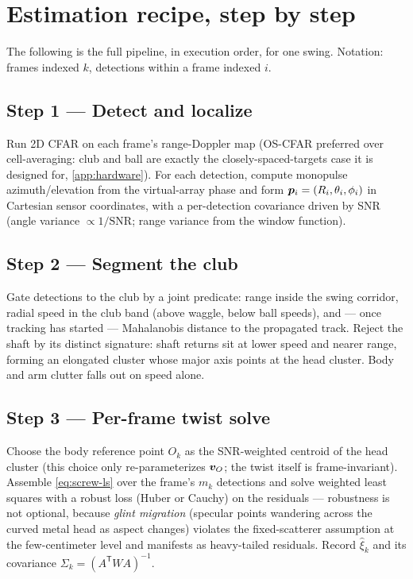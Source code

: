 \section{Estimation recipe, step by step}
\label{sec:screw-recipe}

The following is the full pipeline, in execution order, for one swing.
Notation: frames indexed $k$, detections within a frame indexed $i$.

\subsection*{Step 1 --- Detect and localize}
Run 2D CFAR on each frame's range-Doppler map (OS-CFAR preferred over cell-averaging: club and ball are exactly the closely-spaced-targets case it is designed for, \cref{app:hardware}).
For each detection, compute monopulse azimuth/elevation from the virtual-array phase and form $\bm{p}_i = (R_i, \theta_i, \phi_i)$ in Cartesian sensor coordinates, with a per-detection covariance driven by SNR (angle variance $\propto 1/\mathrm{SNR}$; range variance from the window function).

\subsection*{Step 2 --- Segment the club}
Gate detections to the club by a joint predicate: range inside the swing corridor, radial speed in the club band (above waggle, below ball speeds), and --- once tracking has started --- Mahalanobis distance to the propagated track.
Reject the shaft by its distinct signature: shaft returns sit at lower speed and nearer range, forming an elongated cluster whose major axis points at the head cluster.
Body and arm clutter falls out on speed alone.

\subsection*{Step 3 --- Per-frame twist solve}
Choose the body reference point $O_k$ as the SNR-weighted centroid of the head cluster (this choice only re-parameterizes $\bm{v}_O$; the twist itself is frame-invariant).
Assemble \cref{eq:screw-ls} over the frame's $m_k$ detections and solve weighted least squares with a robust loss (Huber or Cauchy) on the residuals --- robustness is not optional, because \emph{glint migration} (specular points wandering across the curved metal head as aspect changes) violates the fixed-scatterer assumption at the few-centimeter level and manifests as heavy-tailed residuals.
Record $\hat\xi_k$ and its covariance $\Sigma_k = (A^{\mathsf T} W A)^{-1}$.

